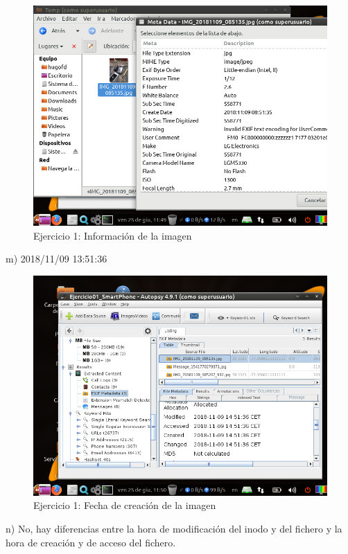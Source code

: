 \documentclass[11pt]{article}
\begin{document}
\begin{figure}[H]
    \caption{Ejercicio 1: Información de la imagen}
    \centering
    \includegraphics[scale=0.7]{e1-13.png}
\end{figure}

m) 2018/11/09 13:51:36

\begin{figure}[H]
    \caption{Ejercicio 1: Fecha de creación de la imagen}
    \centering
    \includegraphics[scale=0.7]{e1-14.png}
\end{figure}

n) No, hay diferencias entre la hora de modificación del inodo y del fichero y la hora de creación y de acceso del fichero.
\end{document}
